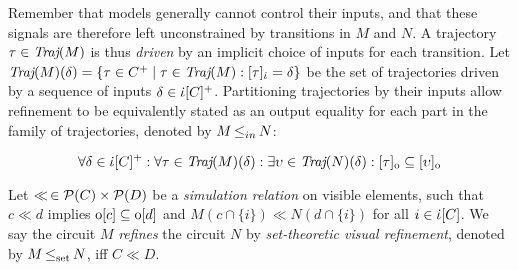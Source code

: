 Remember that models generally cannot control their inputs, and that these signals are therefore left unconstrained by transitions in $M$ and $N$. A trajectory $\tau \in \operatorname{\textit{Traj}}(M)$ is thus \textit{driven} by an implicit choice of inputs for each transition. Let $\operatorname{\textit{Traj}}(M)(\delta) = \{ \tau \in C^{+} \mid \tau \in \operatorname{\textit{Traj}}(M) : [\tau]_{\dot{\iota}} = \delta \}$ be the set of trajectories driven by a sequence of inputs $\delta \in \dot{\iota}[C]^{+}$. Partitioning trajectories by their inputs allow refinement to be equivalently stated as an output equality for each part in the family of trajectories, denoted by $M \operatorname{\leq}_{in} N$:

\begin{equation*}
\forall \delta \in \dot{\iota}[C]^{+} : \forall \tau \in \operatorname{\textit{Traj}}(M)(\delta) : \exists \upsilon \in \operatorname{\textit{Traj}}(N)(\delta) : [\tau]_{\mathrm{o}} \subseteq [\upsilon]_{\mathrm{o}}
\end{equation*}

\noindent {}



 Let $\ll \, \in \mathcal{P}(C) \times \mathcal{P}(D)$ be a \textit{simulation relation} on visible elements, such that $c \ll d$ implies $\mathrm{o}[c] \subseteq \mathrm{o}[d]$ and $M(c \cap \{ i \}) \ll N(d \cap \{ i \})$ for all $i \in \dot{\iota}[C]$. We say the circuit $M$ \textit{refines} the circuit $N$ by \textit{set-theoretic visual refinement}, denoted by $M \operatorname{\operatorname{\leq}_{\textrm{set}}} N$, iff $C \ll D$.


